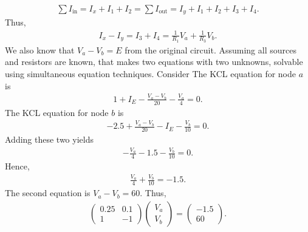 \documentclass{report}
\begin{document}
\begin{itemize}
                \begin{align*}
                    \sum I_{\text{in}} = I_{x} + I_{1} + I_{2} = \sum I_{\text{out}} = I_{y} + I_{1} + I_{2} + I_{3} + I_{4}
                .\end{align*}
                Thus,
                \begin{align*}
                    I_{x} - I_{y} = I_{3} + I_{4} = \frac{1}{R_{1}}V_{a} + \frac{1}{R_{3}}V_{b}
                .\end{align*}
                We also know that $V_{a} - V_{b} = E$ from the original circuit. Assuming all sources and resistors are known, that makes two equations with two unknowns, solvable using simultaneous equation techniques. 
                \bigbreak \noindent 
                Consider
                \bigbreak \noindent 
                \bigbreak \noindent 
                The KCL equation for node $a$ is 
                \begin{align*}
                    1 + I_{E} - \frac{V_{a} - V_{b}}{20} - \frac{V_{a}}{4} = 0
                .\end{align*}
                The KCL equation for node $b$ is 
                \begin{align*}
                    -2.5 + \frac{V_{a}  - V_{b}}{20} - I_{E} - \frac{V_{b}}{10} = 0
                .\end{align*}
                Adding these two yields
                \begin{align*}
                    -\frac{V_{a}}{4}-1.5-\frac{V_{b}}{10} = 0
                .\end{align*}
                Hence,
                \begin{align*}
                    \frac{V_{a}}{4} + \frac{V_{b}}{10} = -1.5
                .\end{align*}
                The second equation is $V_{a} - V_{b} = 60$. Thus,
                \begin{align*}
                    \begin{pmatrix} 0.25 & 0.1 \\ 1 & -1  \end{pmatrix}\begin{pmatrix} V_{a} \\ V_{b} \end{pmatrix} = \begin{pmatrix} -1.5 \\ 60 \end{pmatrix}
                .\end{align*}

\end{itemize}
\end{document}
